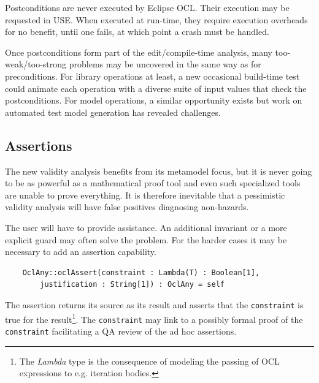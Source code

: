 \documentclass[
]{ceurart}
\begin{document}
Postconditions are never executed by Eclipse OCL. Their execution may be requested in USE. When executed at run-time, they require execution overheads for no benefit, until one fails, at which point a crash must be handled.

Once postconditions form part of the edit/compile-time analysis, many too-weak/too-strong problems may be uncovered in the same way as for preconditions. For library operations at least, a new occasional build-time test could animate each operation with a diverse suite of input values that check the postconditions. For model operations, a similar opportunity exists but work on automated test model generation has revealed challenges. 




\subsection{Assertions}

The new validity analysis benefits from its metamodel focus, but it is never going to be as powerful as a mathematical proof tool and even such specialized tools are unable to prove everything. It is therefore inevitable that a pessimistic validity analysis will have false positives diagnosing non-hazards. 

The user will have to provide assistance. An additional invariant or a more explicit guard may often solve the problem. For the harder cases it may be necessary to add an assertion capability.

\begin{verbatim}
    OclAny::oclAssert(constraint : Lambda(T) : Boolean[1],
        justification : String[1]) : OclAny = self
\end{verbatim}

The assertion returns its source as its result and asserts that the \verb|constraint| is true for the result\footnote{The \emph{Lambda} type is the consequence of modeling the passing of OCL expressions to e.g. iteration bodies.}. The \verb|constraint| may link to a possibly formal proof of the \verb|constraint| facilitating a QA review of the ad hoc assertions.
\end{document}
